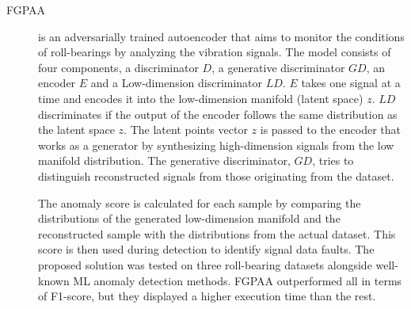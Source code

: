 \begin{description}
    \item[FGPAA \cite{wu.etal_FaultAttentionGenerativeProbabilistic_2020}] is an adversarially trained autoencoder that aims to monitor the conditions of roll-bearings by analyzing the vibration signals. The model consists of four components, a discriminator $D$, a generative discriminator $GD$, an encoder $E$ and a Low-dimension discriminator $LD$. $E$ takes one signal at a time and encodes it into the low-dimension manifold (latent space) $z$. $LD$ discriminates if the output of the encoder follows the same distribution as the latent space $z$. The latent points vector $z$ is passed to the encoder that works as a generator by synthesizing high-dimension signals from the low manifold distribution. The generative discriminator, $GD$,  tries to distinguish reconstructed signals from those originating from the dataset.

    The anomaly score is calculated for each sample by comparing the distributions of the generated low-dimension manifold and the reconstructed sample with the distributions from the actual dataset. This score is then used during detection to identify signal data faults. The proposed solution was tested on three roll-bearing datasets alongside well-known ML anomaly detection methods. FGPAA outperformed all in terms of F1-score, but they displayed a higher execution time than the rest.
\end{description}

